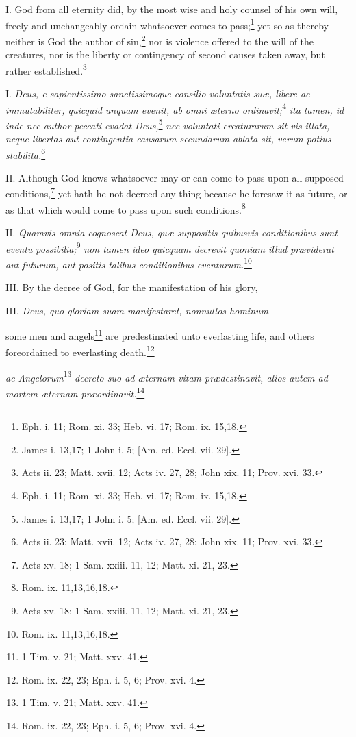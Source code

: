 I. God from all eternity did, by the most wise and holy counsel of his own will, freely and unchangeably ordain whatsoever comes to pass;\footnote{Eph. i. 11; Rom. xi. 33;  Heb. vi. 17; Rom. ix. 15,18.} yet so as thereby neither is God the author of sin,\footnote{James i. 13,17; 1 John i. 5; [Am. ed.  Eccl. vii. 29].} nor is violence offered to the will of the creatures, nor is the liberty or contingency of second causes taken away, but rather established.\footnote{Acts ii. 23;  Matt. xvii. 12; Acts iv. 27, 28;  John xix. 11; Prov. xvi. 33.}

I. \emph{Deus, e sapientissimo sanctissimoque consilio voluntatis suæ, libere ac immutabiliter, quicquid unquam evenit, ab omni æterno ordinavit;}\footnote{Eph. i. 11;  Rom. xi. 33; Heb. vi. 17;  Rom. ix. 15,18.}\emph{ ita tamen, id inde nec author peccati evadat Deus,}\footnote{James i. 13,17;  1 John i. 5; [Am. ed. Eccl. vii. 29].}\emph{ nec voluntati creaturarum sit vis illata, neque libertas aut contingentia causarum secundarum ablata sit, verum potius stabilita.}\footnote{Acts ii. 23; Matt. xvii. 12;  Acts iv. 27, 28; John xix. 11;  Prov. xvi. 33.}

II. Although God knows whatsoever may or can come to pass upon all supposed conditions,\footnote{Acts xv. 18;  1 Sam. xxiii. 11, 12; Matt. xi. 21, 23.} yet hath he not decreed any thing because he foresaw it as future, or as that which would come to pass upon such conditions.\footnote{Rom. ix. 11,13,16,18.}

II. \emph{Quamvis omnia cognoscat Deus, quæ suppositis quibusvis conditionibus sunt eventu possibilia;}\footnote{Acts xv. 18; 1 Sam. xxiii. 11, 12; Matt. xi. 21, 23.}\emph{ non tamen ideo quicquam decrevit quoniam illud præviderat aut futurum, aut positis talibus conditionibus eventurum.}\footnote{Rom. ix. 11,13,16,18.}

III. By the decree of God, for the manifestation of his glory,

III. \emph{Deus, quo gloriam suam manifestaret, nonnullos hominum}

some men and angels\footnote{1 Tim. v. 21;  Matt. xxv. 41.} are predestinated unto everlasting life, and others foreordained to everlasting death.\footnote{Rom. ix. 22, 23; Eph. i. 5, 6;  Prov. xvi. 4.}

\emph{ac Angelorum}\footnote{1 Tim. v. 21; Matt. xxv. 41.}\emph{ decreto suo ad æternam vitam prædestinavit, alios autem ad mortem æternam præordinavit.}\footnote{Rom. ix. 22, 23; Eph. i. 5, 6;  Prov. xvi. 4.}

